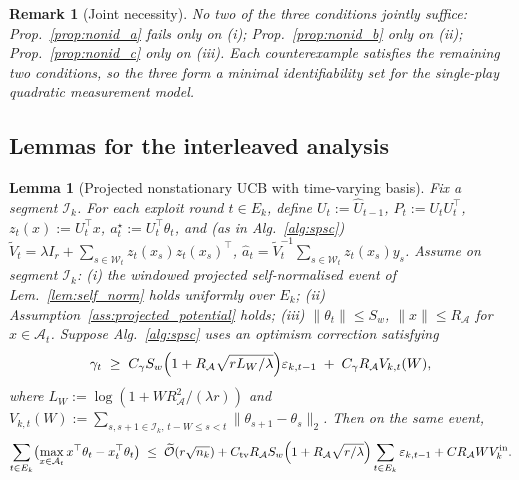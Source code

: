 \documentclass{article}
\newcommand{\cA}{\mathcal{A}}
\newcommand{\cI}{\mathcal{I}}
\newcommand{\cW}{\mathcal{W}}
\newcommand{\tilO}{\widetilde{\mathcal{O}}}
\newtheorem{lemma}{Lemma}
\newtheorem{remark}{Remark}
\begin{document}
\begin{remark}[Joint necessity]
\label{rem:joint_necessity_conf}
No two of the three conditions jointly suffice:
Prop.~\ref{prop:nonid_a} fails only on (i);
Prop.~\ref{prop:nonid_b} only on (ii);
Prop.~\ref{prop:nonid_c} only on (iii). Each counterexample
satisfies the remaining two conditions, so the three form a minimal
identifiability set for the single-play quadratic measurement model.
\end{remark}

\subsection{Lemmas for the interleaved analysis}
\label{app:proof_main_lemmas}

\begin{lemma}[Projected nonstationary UCB with time-varying basis]
\label{lem:F2pp}
Fix a segment $\cI_k$. For each exploit round $t\in E_k$, define
$U_t:=\widehat U_{t-1}$, $P_t:=U_t U_t^\top$, $z_t(x):=U_t^\top x$,
$a_t^\star:=U_t^\top\theta_t$, and (as in Alg.~\ref{alg:spsc})
$\widetilde V_t = \lambda I_r+\sum_{s\in\cW_t}z_t(x_s)z_t(x_s)^\top$,
$\widehat a_t = \widetilde V_t^{-1}\sum_{s\in\cW_t}z_t(x_s)y_s$.
Assume on segment $\cI_k$: (i) the windowed projected self-normalised
event of Lem.~\ref{lem:self_norm} holds uniformly over $E_k$;
(ii) Assumption~\ref{ass:projected_potential} holds;
(iii) $\|\theta_t\|\le S_w$, $\|x\|\le R_\cA$ for $x\in\cA_t$.
Suppose Alg.~\ref{alg:spsc} uses an optimism correction satisfying
\begin{equation}
\gamma_t \;\ge\; C_\gamma S_w\Bigl(1+R_\cA\sqrt{rL_W/\lambda}\Bigr)\varepsilon_{k,t-1}
\;+\; C_\gamma R_\cA V_{k,t}(W),
\label{eq:gamma_choice}
\end{equation}
where $L_W:=\log(1+WR_\cA^2/(\lambda r))$ and
$V_{k,t}(W):=\sum_{s,s+1\in\cI_k,\,t-W\le s<t}\|\theta_{s+1}-\theta_s\|_2$.
Then on the same event,
\begin{equation}
\sum_{t\in E_k}\bigl(\max_{x\in\cA_t}x^\top\theta_t-x_t^\top\theta_t\bigr)
\;\le\; \tilO(r\sqrt{n_k})
+ C_{\rm tv}R_\cA S_w\Bigl(1+R_\cA\sqrt{r/\lambda}\Bigr)\sum_{t\in E_k}\varepsilon_{k,t-1}
+ C R_\cA W V_k^{\rm in}.
\label{eq:F2pp}
\end{equation}
\end{lemma}
\end{document}
